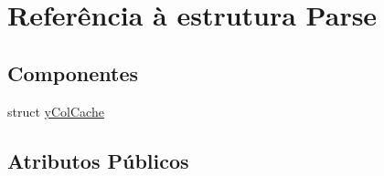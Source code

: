 \hypertarget{struct_parse}{\section{Referência à estrutura Parse}
\label{struct_parse}
}
\subsection*{Componentes}
\begin{DoxyCompactItemize}
\item 
struct \hyperlink{struct_parse_1_1y_col_cache}{y\-Col\-Cache}
\end{DoxyCompactItemize}
\subsection*{Atributos Públicos}
